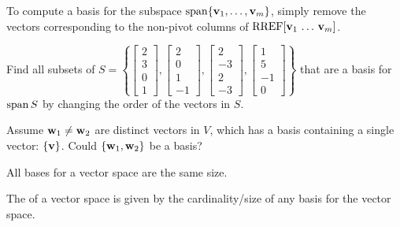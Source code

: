 


\begin{applicationActivities}

\begin{fact}
  To compute a basis for the subspace \(\operatorname{span}\{\mathbf v_1,\dots,\mathbf v_m\}\),
  simply remove the vectors corresponding to the non-pivot columns of
  \(\operatorname{RREF}[\mathbf v_1\,\dots\,\mathbf v_m]\).
\end{fact}

\begin{activity}{10}
  Find all subsets of \(S=\left\{
  \begin{bmatrix}2\\3\\0\\1\end{bmatrix},
  \begin{bmatrix}2\\0\\1\\-1\end{bmatrix},
  \begin{bmatrix}2\\-3\\2\\-3\end{bmatrix},
  \begin{bmatrix}1\\5\\-1\\0\end{bmatrix}
  \right\}
  \) that are a basis for \(\operatorname{span} S\) by changing the order
  of the vectors in \(S\).
\end{activity}

\begin{activity}{10}
  Assume \(\mathbf w_1\not=\mathbf w_2\) are distinct vectors in \(V\),
  which has a basis containing a single vector: \(\{\mathbf v\}\).
  Could \(\{\mathbf w_1,\mathbf w_2\}\) be a basis?
\end{activity}

\begin{fact}
  All bases for a vector space are the same size.
\end{fact}

\begin{definition}
  The  of a vector space is given by the cardinality/size
  of any basis for the vector space.
\end{definition}


\end{applicationActivities}
